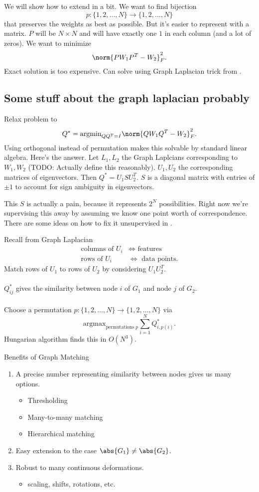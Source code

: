 \message{ !name(Research_Statement.tex)}\documentclass{article}[11pt]
\begin{document}
We will show how to extend in a bit. We want to find bijection \[p: \{1,2,\ldots,N\} \to \{1,2,\ldots,N\}\] that preserves the weights as best as possible. But it's easier to represent with a matrix. $P$ will be $N\times N$ and will have exactly one $1$ in each column (and a lot of zeros). We want to minimize
\[\norm{PW_1P^T - W_2}^2_F.\]
Exact solution is too expensive. Can solve using Graph Laplacian trick from \cite{Umeyama1988,Knossow2009}.

\subsection{Some stuff about the graph laplacian probably}
Relax problem to
\[Q^* = \text{argmin}_{QQ^T=I}\norm{QW_1Q^T - W_2}^2_F.\]
Using orthogonal instead of permutation makes this solvable by standard linear algebra. Here's the answer. Let $L_1,L_2$ the Graph Laplcians corresponding to $W_1,W_2$ (TODO: Actually define this reasonably). $U_1,U_2$ the corresponding matrices of eigenvectors. Then $Q^* = U_1SU_2^T$. $S$ is a diagonal matrix with entries of $\pm 1$ to account for sign ambiguity in eigenvectors.

This $S$ is actually a pain, because it represents $2^N$ possibilities. Right now we're supervising this away by assuming we know one point worth of correspondence. There are some ideas on how to fix it unsupervised in \cite{Knossow2009}.

Recall from Graph Laplacian
\begin{align*}
  \text{columns of }U_i &\iff \text{ features} \\
  \text{rows of }U_i &\iff \text{ data points}.
\end{align*}
Match rows of $U_1$ to rows of $U_2$ by considering $U_1U_2^T$. \\~\\

$Q^*_{ij}$ gives the similarity between node $i$ of $G_1$ and node $j$ of $G_2$. \\~\\
Choose a permutation $p: \{1,2,\ldots,N\} \to \{1,2,\ldots,N\}$ via
\[\text{argmax}_{\text{permutations }p}\sum_{i=1}^N Q^*_{i,p(i)}.\]
Hungarian algorithm finds this in $O(N^3)$.

Benefits of Graph Matching
\begin{enumerate}
\item A precise number representing similarity between nodes gives us many options.
  \begin{itemize}
  \item Thresholding
  \item Many-to-many matching
  \item Hierarchical matching
  \end{itemize}
\item Easy extension to the case $\abs{G_1}\neq\abs{G_2}$.
\item Robust to many continuous deformations.
  \begin{itemize}
  \item scaling, shifts, rotations, etc.
  \end{itemize}
\end{enumerate}
\end{document}
